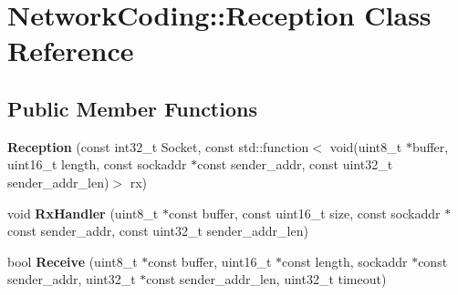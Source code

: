 \hypertarget{class_network_coding_1_1_reception}{}\section{Network\+Coding\+:\+:Reception Class Reference}
\label{class_network_coding_1_1_reception}
\subsection*{Public Member Functions}
\begin{DoxyCompactItemize}
\item 
{\bfseries Reception} (const int32\+\_\+t Socket, const std\+::function$<$ void(uint8\+\_\+t $\ast$buffer, uint16\+\_\+t length, const sockaddr $\ast$const sender\+\_\+addr, const uint32\+\_\+t sender\+\_\+addr\+\_\+len)$>$ rx)\hypertarget{class_network_coding_1_1_reception_a217e7e7924e2f8d7d0e93c95eb7802d0}{}\label{class_network_coding_1_1_reception_a217e7e7924e2f8d7d0e93c95eb7802d0}

\item 
void {\bfseries Rx\+Handler} (uint8\+\_\+t $\ast$const buffer, const uint16\+\_\+t size, const sockaddr $\ast$const sender\+\_\+addr, const uint32\+\_\+t sender\+\_\+addr\+\_\+len)\hypertarget{class_network_coding_1_1_reception_ad726803ebdc2d2761e0e11f6affcd488}{}\label{class_network_coding_1_1_reception_ad726803ebdc2d2761e0e11f6affcd488}

\item 
bool {\bfseries Receive} (uint8\+\_\+t $\ast$const buffer, uint16\+\_\+t $\ast$const length, sockaddr $\ast$const sender\+\_\+addr, uint32\+\_\+t $\ast$const sender\+\_\+addr\+\_\+len, uint32\+\_\+t timeout)\hypertarget{class_network_coding_1_1_reception_a1b1a8112382aeb967f46b73e385954d7}{}\label{class_network_coding_1_1_reception_a1b1a8112382aeb967f46b73e385954d7}

\end{DoxyCompactItemize}
